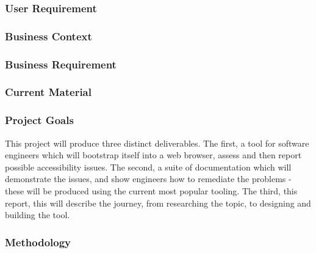 \subsubsection{User Requirement}
\subsubsection{Business Context}
\subsubsection{Business Requirement}
\subsubsection{Current Material}

\subsubsection{Project Goals}
This project will produce three distinct deliverables. The first, a tool for software engineers which will bootstrap itself into a web
browser, assess and then report possible accessibility issues. The second, a suite of documentation which will demonstrate the issues, and
show engineers how to remediate the problems - these will be produced using the current most popular tooling. The third, this report,
this will describe the journey, from researching the topic, to designing and building the tool.

\subsubsection{Methodology}
